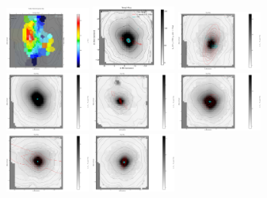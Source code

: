 \begin{figure}
      \centering
      \includegraphics[width=0.245\textwidth]{Vmaps/ngc0612_stellar_sigma.png}
      \includegraphics[width=0.245\textwidth]{Vmaps/ngc3557_stellar_img.png}
      \includegraphics[width=0.245\textwidth]{Vmaps/ngc3100_stellar_img.png}
      \includegraphics[width=0.245\textwidth]{Vmaps/ic1459_stellar_img.png}
      \includegraphics[width=0.245\textwidth]{Vmaps/pks0718-34_stellar_img.png}
      \includegraphics[width=0.245\textwidth]{Vmaps/ic4296_stellar_img.png}
      \includegraphics[width=0.245\textwidth]{Vmaps/ngc7075_stellar_img.png}
      \includegraphics[width=0.245\textwidth]{Vmaps/ic1531_stellar_img.png}

\end{figure}
